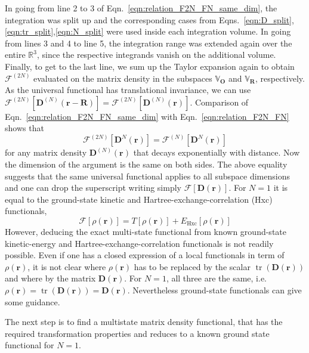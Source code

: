 \documentclass[journal=jpclcd,manuscript=letter]{achemso}
\DeclareMathOperator{\tr}{tr}
\newcommand\m[1]{\mathbf{#1}}
\renewcommand\vec[1]{\mathbf{#1}}
\begin{document}
In going from line 2 to 3 of Eqn.~\ref{eqn:relation_F2N_FN_same_dim}, the integration was split up and the corresponding cases from Eqns.~\ref{eqn:D_split},\ref{eqn:tr_split},\ref{eqn:N_split} were used inside each integration volume. In going from lines 3 and 4 to line 5, the integration range was extended again over the entire $\mathbb{R}^3$, since the respective integrands vanish on the additional volume. Finally, to get to the last line, we sum up the Taylor expansion again to obtain $\mathcal{F}^{(2N)}$ evaluated on the matrix density in the subspaces $\mathbb{V}_{\vec{O}}$ and $\mathbb{V}_{\vec{R}}$, respectively. As the universal functional has translational invariance, we can use $\mathcal{F}^{(2N)}[\m{D}^{(N)}(\vec{r}-\vec{R})] = \mathcal{F}^{(2N)}[\m{D}^{(N)}(\vec{r})]$.
Comparison of Eqn.~\ref{eqn:relation_F2N_FN_same_dim} with Eqn.~\ref{eqn:relation_F2N_FN} shows that
\begin{equation}
 \mathcal{F}^{(2N)}[\m{D}^{N}(\vec{r})] = \mathcal{F}^{(N)}[\m{D}^{N}(\vec{r})]
\end{equation}
for any matrix density $\m{D}^{(N)}(\vec{r})$ that decays exponentially with distance.
Now the dimension of the argument is the same on both sides. The above equality suggests that the same universal functional applies to all subspace dimensions and one can drop the superscript writing simply $\mathcal{F}[\m{D}(\vec{r})]$. For $N=1$ it is equal to the ground-state kinetic and Hartree-exchange-correlation (Hxc) functionals,
\begin{equation}
 \mathcal{F}[\rho(\vec{r})] = T[\rho(\vec{r})] + E_{\text{Hxc}}[\rho(\vec{r})]
\end{equation}
However, deducing the exact multi-state functional from known ground-state kinetic-energy and Hartree-exchange-correlation functionals is not readily possible.
Even if one has a closed expression of a local functionals in term of $\rho(\vec{r})$,
it is not clear where $\rho(\vec{r})$ has to be replaced by the scalar $\tr(\m{D}(\vec{r}))$
and where by the matrix $\m{D}(\vec{r})$.
For $N=1$, all three are the same, i.e. $\rho(\vec{r}) = \tr(\m{D}(\vec{r})) = \m{D}(\vec{r})$.
Nevertheless ground-state functionals can give some guidance.

The next step is to find a multistate matrix density functional, that has the required transformation properties
 and reduces to a known ground state functional for $N=1$.
\end{document}
